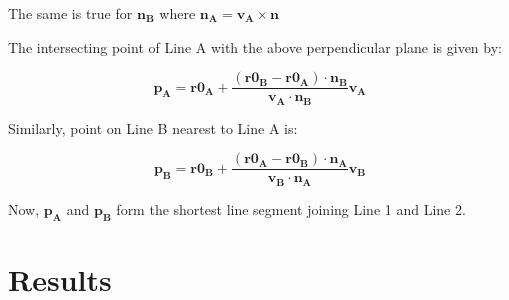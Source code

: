 \documentclass{article}
\begin{document}
The same is true for $\mathbf{n_B} $ where $\mathbf{n_A}= \mathbf{v_A} \times \mathbf{n}$

The intersecting point of Line A with the above perpendicular plane is given by: 

\begin{equation}
	\mathbf{p_A}=\mathbf{r0_A}+ \frac{(\mathbf{r0_B}-\mathbf{r0_A})\cdot\mathbf{n_B}}{\mathbf{v_A}\cdot\mathbf{n_B}} \mathbf{v_A}
\end{equation}

Similarly, point on Line B nearest to Line A is:

\begin{equation}
	\mathbf{p_B}=\mathbf{r0_B}+ \frac{(\mathbf{r0_A}-\mathbf{r0_B})\cdot\mathbf{n_A}}{\mathbf{v_B}\cdot\mathbf{n_A}} \mathbf{v_B}
\end{equation}

Now, $\mathbf{p_A}$ and $\mathbf{p_B}$ form the shortest line segment joining Line 1 and Line 2.

\newpage

\section{Results}
\end{document}
